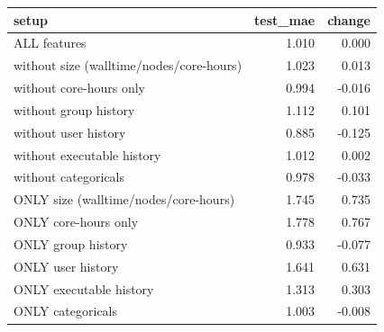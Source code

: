 \begin{tabular}{lrr}
\toprule
setup & test_mae & change \\
\midrule
ALL features & 1.010 & 0.000 \\
without size (walltime/nodes/core-hours) & 1.023 & 0.013 \\
without core-hours only & 0.994 & -0.016 \\
without group history & 1.112 & 0.101 \\
without user history & 0.885 & -0.125 \\
without executable history & 1.012 & 0.002 \\
without categoricals & 0.978 & -0.033 \\
ONLY size (walltime/nodes/core-hours) & 1.745 & 0.735 \\
ONLY core-hours only & 1.778 & 0.767 \\
ONLY group history & 0.933 & -0.077 \\
ONLY user history & 1.641 & 0.631 \\
ONLY executable history & 1.313 & 0.303 \\
ONLY categoricals & 1.003 & -0.008 \\
\bottomrule
\end{tabular}

